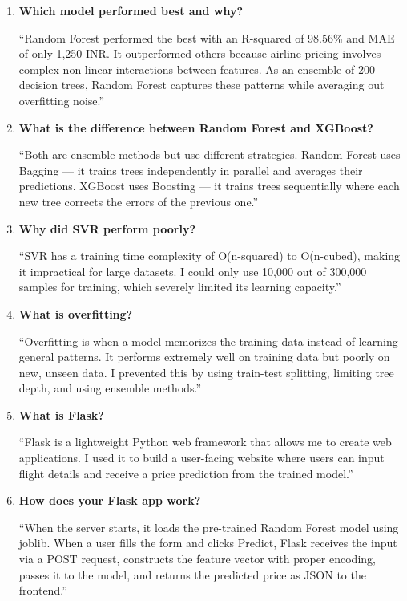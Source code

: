 \documentclass[12pt, a4paper]{article}
\begin{document}
\begin{enumerate}[leftmargin=*, label=\textbf{Q\arabic*.}]
\item \textbf{Which model performed best and why?}
\begin{tipbox}[title=Answer]
    ``Random Forest performed the best with an R-squared of 98.56\% and MAE of only 1,250 INR. It outperformed others because airline pricing involves complex non-linear interactions between features. As an ensemble of 200 decision trees, Random Forest captures these patterns while averaging out overfitting noise.''
\end{tipbox}

\item \textbf{What is the difference between Random Forest and XGBoost?}
\begin{tipbox}[title=Answer]
    ``Both are ensemble methods but use different strategies. Random Forest uses Bagging — it trains trees independently in parallel and averages their predictions. XGBoost uses Boosting — it trains trees sequentially where each new tree corrects the errors of the previous one.''
\end{tipbox}

\item \textbf{Why did SVR perform poorly?}
\begin{tipbox}[title=Answer]
    ``SVR has a training time complexity of O(n-squared) to O(n-cubed), making it impractical for large datasets. I could only use 10,000 out of 300,000 samples for training, which severely limited its learning capacity.''
\end{tipbox}

\item \textbf{What is overfitting?}
\begin{tipbox}[title=Answer]
    ``Overfitting is when a model memorizes the training data instead of learning general patterns. It performs extremely well on training data but poorly on new, unseen data. I prevented this by using train-test splitting, limiting tree depth, and using ensemble methods.''
\end{tipbox}

\item \textbf{What is Flask?}
\begin{tipbox}[title=Answer]
    ``Flask is a lightweight Python web framework that allows me to create web applications. I used it to build a user-facing website where users can input flight details and receive a price prediction from the trained model.''
\end{tipbox}

\item \textbf{How does your Flask app work?}
\begin{tipbox}[title=Answer]
    ``When the server starts, it loads the pre-trained Random Forest model using joblib. When a user fills the form and clicks Predict, Flask receives the input via a POST request, constructs the feature vector with proper encoding, passes it to the model, and returns the predicted price as JSON to the frontend.''
\end{tipbox}


\end{enumerate}
\end{document}
